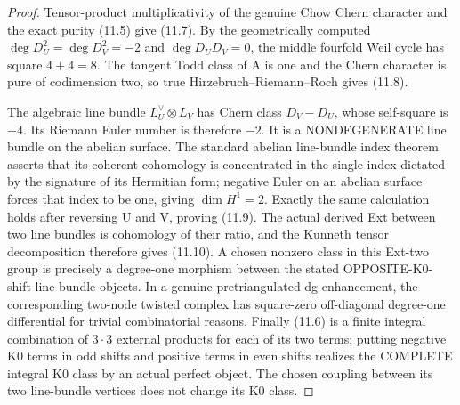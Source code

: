\documentclass[11pt,a4paper]{article}
\begin{document}
\begin{proof}
Tensor-product
multiplicativity
of the
genuine Chow
Chern character
and the exact
purity (11.5)
give (11.7).
By the
geometrically
computed
\(\deg D_U^2=
\deg D_V^2=-2\)
and
\(\deg D_UD_V=0\),
the middle
fourfold
Weil cycle
has square
\(4+4=8\).
The tangent
Todd class
of A is one
and the
Chern character
is pure of
codimension two,
so true
Hirzebruch--Riemann--Roch
gives (11.8).

The algebraic
line bundle
\(
L_U^\vee\otimes L_V
\)
has Chern
class \(D_V-D_U\),
whose self-square
is \(-4\).
Its Riemann
Euler number
is therefore
\(-2\).
It is a
NONDEGENERATE
line bundle
on the abelian
surface.
The standard
abelian line-bundle
index theorem
asserts that
its coherent
cohomology
is concentrated
in the
single
index dictated
by the
signature of
its Hermitian
form; negative
Euler on an
abelian surface
forces that
index to be
one, giving
\(\dim H^1=2\).
Exactly the
same calculation
holds after
reversing U and V,
proving (11.9).
The actual
derived Ext
between two
line bundles
is cohomology
of their ratio,
and the Kunneth
tensor decomposition
therefore gives
(11.10).
A chosen
nonzero
class in this
Ext-two group
is precisely
a degree-one
morphism between
the stated
OPPOSITE-K0-shift
line bundle
objects. In
a genuine
pretriangulated
dg enhancement,
the corresponding
two-node
twisted complex
has square-zero
off-diagonal
degree-one
differential
for trivial
combinatorial
reasons.
Finally
(11.6)
is a finite
integral
combination
of
\(3\cdot3\)
external products
for each
of its
two terms;
putting
negative K0
terms in
odd shifts
and positive
terms in
even shifts
realizes the
COMPLETE
integral K0
class by
an actual
perfect object.
The chosen
coupling between
its two
line-bundle
vertices
does not
change its
K0 class.
\end{proof}
\end{document}
